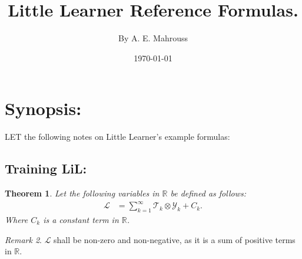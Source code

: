 \documentclass[10pt]{article}
\title{%
	\vspace{-1.5em}%
	\large\textbf{Little Learner Reference Formulas.}%
}
\author{By A. E. Mahrouss}
\date{\today}
\theoremstyle{plain}
\newtheorem{theorem}{Theorem}[section]
\theoremstyle{definition}
\theoremstyle{remark}
\newtheorem{remark}[theorem]{Remark}
\begin{document}

\maketitle
\tableofcontents
\newpage

\section{Synopsis:}

\lettrine[lines=1, lhang=0.1, loversize=0.2]{L}ET the following notes on Little Learner's example formulas:

\subsection{Training LiL:}

\begin{theorem}
Let the following variables in $\mathbb{R}$ be defined as follows:
\begin{align*}
    \mathcal{L} &= \sum_{k=1}^{\infty} \mathcal{T}_k \otimes \mathcal{Y}_k + C_k.
\end{align*}
Where $C_k$ is a constant term in $\mathbb{R}$.
\end{theorem}

\begin{remark}
    $\mathcal{L}$ shall be non-zero and non-negative, as it is a sum of positive terms in $\mathbb{R}$.
\end{remark}

\nocite{*}



\end{document}
